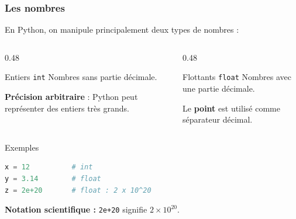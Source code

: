 \documentclass[10pt]{beamer}
\begin{document}
\begin{frame}[containsverbatim]
\frametitle{Les nombres}

En Python, on manipule principalement deux types de nombres :

\begin{columns}[T]
\begin{column}{0.48\textwidth}
\begin{block}{Entiers \texttt{int}}
Nombres sans partie décimale.

\textbf{Précision arbitraire} : Python peut représenter
des entiers très grands.
\end{block}
\end{column}

\begin{column}{0.48\textwidth}
\begin{block}{Flottants \texttt{float}}
Nombres avec une partie décimale.

Le \textbf{point} est utilisé comme séparateur décimal.
\end{block}
\end{column}
\end{columns}

\vspace{0.25cm}

\begin{exampleblock}{Exemples}
\begin{lstlisting}[language=Python]
x = 12          # int
y = 3.14        # float
z = 2e+20       # float : 2 x 10^20
\end{lstlisting}
\end{exampleblock}

\begin{center}
\textbf{Notation scientifique :} \texttt{2e+20} signifie $2 \times 10^{20}$.
\end{center}

\end{frame}
\end{document}
